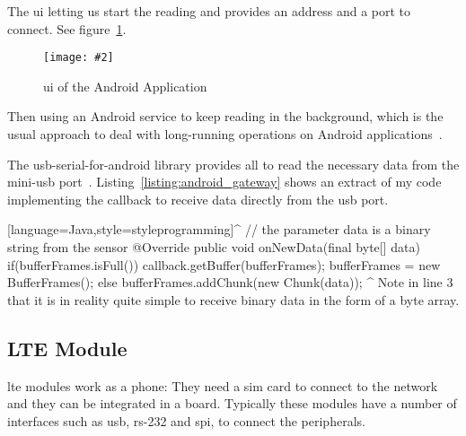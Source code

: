 \documentclass[hidelinks,11pt,a4paper,oneside,article]{memoir}
\newcommand{\putimage}[3][10] %
{
\begin{figure}[h]
	\centering
	\captionsetup{justification=centering}
	\texttt{[image: \#2]}
	\caption{#3}
	\label{fig:#2}
\end{figure}
}
\begin{document}
The \gls{ui} letting us start the reading and provides an address and a port to connect. See figure~\ref{fig:android-screenshot}.
\putimage[5]{android-screenshot}{\gls{ui} of the Android Application}



%


Then using an Android service to keep reading in the background, which is the usual approach to deal with long-running operations on Android applications~\cite{android-services}.

The usb-serial-for-android library provides all to read the necessary data from the mini-usb port~\cite{usb-serial-for-android}. Listing~\ref{listing:android_gateway} shows an extract of my code implementing the callback to receive data directly from the \gls{usb} port.

[language=Java,style=styleprogramming]^
// the parameter data is a binary string from the sensor
@Override
public void onNewData(final byte[] data) {
    if(bufferFrames.isFull()){
        callback.getBuffer(bufferFrames);
        bufferFrames = new BufferFrames();
    }else{
        bufferFrames.addChunk(new Chunk(data));
    }
}
^
Note in line 3 that it is in reality quite simple to receive binary data in the form of a byte array.


\subsection{LTE Module}
\acrfull{lte} modules work as a phone: They need a \gls{sim} card to connect to the network and they can be integrated in a board. Typically these modules have a number of interfaces such as \gls{usb}, rs-232 and \gls{spi}, to connect the peripherals.
\end{document}
